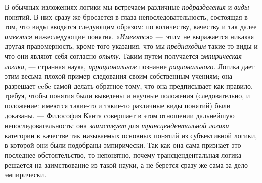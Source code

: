 \documentclass[twoside]{article}
\begin{document}
{{В обычных изложениях логики мы встречаем различные
{\em подразделения} и
{\em виды} понятий. В них
сразу же бросается в глаза непоследовательность, состоящая в том, что виды
вводятся следующим образом: по количеству, качеству и так далее
{\em имеются}
нижеследующие понятия.
«{\em Имеются}» —~этим не
выражается никакая другая правомерность, кроме того указания, что мы
{\em преднаходим}
такие-то виды и что они являют себя согласно
{\em опыту}. Таким путем
получается {\em эмпирическая логика}, —
странная наука,
{\em иррациональное}
познание
{\em рационального}.
Логика дает этим весьма плохой пример следования своим
собственным учениям; она разрешает ceбe самой делать обратное тому, что она
предписывает как правило, требуя, чтобы понятия были выведены и научные
положения (следовательно, и положение: имеются такие-то и такие-то
различные виды понятий) были доказаны. — Философия Канта
совершает в этом отношении дальнейшую непоследовательность: она
{\em заимствует} для
{\em трансцендентальной логики}
категории в качестве так называемых основных
понятий из субъективной логики, в которой они были подобраны эмпирически.
Так как она сама признает это последнее обстоятельство, то непонятно,
почему трансцендентальная логика решается на заимствование из такой науки,
а не берется сразу же сама за дело эмпирически.

}}
\end{document}
